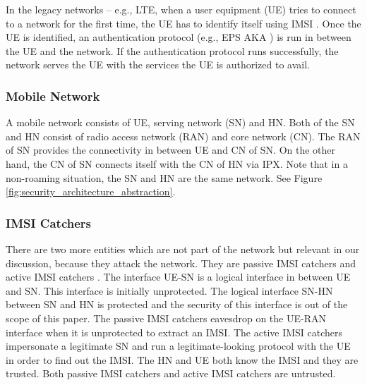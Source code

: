 \documentclass[conference]{IEEEtran}
\begin{document}
In the legacy networks -- e.g., LTE, when a user equipment (UE) tries to connect to a network for the first time, the UE has to identify itself using IMSI \cite{TS33401_inital_identification}. Once the UE is identified, an authentication protocol (e.g., EPS AKA \cite{TS33401_inital_identification}) is run in between the UE and the network. If the authentication protocol runs successfully, the network serves the UE with the services the UE is authorized to avail.


\subsubsection{Mobile Network}
A mobile network consists of UE, serving network (SN) and HN. Both of the SN and HN consist of radio access network (RAN) and core network (CN). The RAN of SN provides the connectivity in between UE and CN of SN. On the other hand, the CN of SN connects itself with the CN of HN via IPX. Note that in a non-roaming situation, the SN and HN are the same network. See Figure \ref{fig:security_architecture_abstraction}.

\subsubsection{IMSI Catchers}
There are two more entities which are not part of the network but relevant in our discussion, because they attack the network. They are passive IMSI catchers and active IMSI catchers \cite{IBE_mohsin}. The interface UE-SN is a logical interface in between UE and SN. This interface is initially unprotected. The logical interface SN-HN between SN and HN is protected and the security of this interface is out of the scope of this paper. The passive IMSI catchers eavesdrop on the UE-RAN interface when it is unprotected to extract an IMSI. The active IMSI catchers impersonate a legitimate SN and run a legitimate-looking protocol with the UE in order to find out the IMSI. The HN and UE both know the IMSI and they are trusted. Both passive IMSI catchers and active IMSI catchers are untrusted. 
\end{document}
